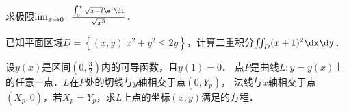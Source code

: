 \documentclass[plain,noanswer,medmath]{../../template/jnuexam}
\begin{document}


\begin{problem}[points=10]
求极限$\lim_{x \to 0^+} \frac{\int_0^x \sqrt{x - t} \e^t \dt}{\sqrt{x^3}}$．
\end{problem}










\begin{problem}[points=11]
已知平面区域$D = \left\{(x,y)|x^2 + y^2 \le 2y \right\}$，计算二重积分$\iint_D (x + 1)^2 \dx\dy$．
\end{problem}


\begin{problem}[points=11]
设$y(x)$是区间$\left(0,\frac{3}{2} \right)$内的可导函数，且$y(1) = 0$．
点$P$是曲线$L:y = y(x)$上的任意一点．$L$在$P$处的切线与$y$轴相交于点$\left(0,Y_p\right)$，
法线与$x$轴相交于点$\left(X_p,0 \right)$，若$X_p = Y_p$，求$L$上点的坐标$(x,y)$满足的方程．
\end{problem}




\end{document}
